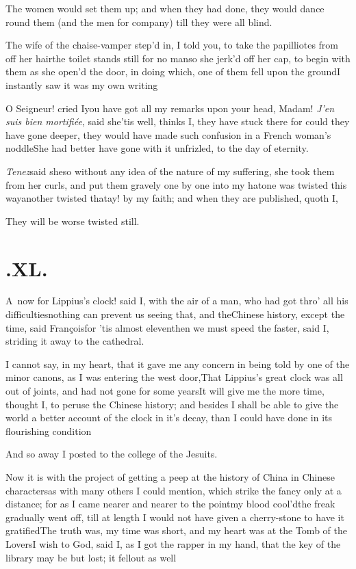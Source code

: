 \documentclass{article}
\begin{document}
The women would set them up; and when they had done, they would
dance round them (and the men for company) till they were all
blind.

The wife of the chaise-vamper step’d in, I told you, to
take the papilliotes from off her hair\tsh the toilet
stands still for no man\tsh so she jerk’d off her
cap, to begin with them as she open’d the door, in doing
which, one of them fell upon the ground\tsk I instantly saw it was my own
writing\tsh

O Seigneur! cried I\tsk you have got all my remarks upon your
head, Madam!\break
\tsh \textit{J’en suis bien
mortifiée}, said she\tsh ’tis well, thinks
I, they have stuck there\break
\tsk for could they have gone deeper,
they would have made such confusion in a French
woman’s noddle\tsk She had better have gone with it
unfrizled, to the day of eternity.

\textit{Tenez}\tsk said she\tsk so without any idea of the
nature of my suffering, she took them from her curls, and put them
gravely one by one into my hat\tsh one was twisted this
way\tsh another twisted that\tsh ay! by my faith;
and when they are published, quoth I,\tsh

They will be worse twisted still.

\vfill{}\eject
\section{.\enspace XL.}

\lettrine{A}{\,} now for Lippius’s
clock! said I, with the air of a man, who had got thro’ all
his difficulties\tsh nothing can prevent us seeing that,
and the\break Chinese history, \etc except the time,\break
said François\tsh for ’tis almost
eleven\tsk then we must speed the faster, said I, striding it
away to the cathedral.

I cannot say, in my heart, that it gave me any concern in being
told by one of the minor canons, as I was entering the west
door,\tsk That Lippius’s great clock was all out of
joints, and had not gone for some years\tsh It will give
me the more time, thought I, to peruse the Chinese history;
and besides I shall be able to give the world a better account of
the
clock in it’s decay, than I could have done in its flourishing
condition\tsh

\tsh And so away I posted to the college of the
Jesuits.

Now it is with the project of getting a peep at the history of
China in Chinese characters\tsk as with many others
I could mention, which strike the fancy only at a distance; for as
I came nearer and nearer to the point\tsk my blood
cool’d\tsk the freak gradually went off, till at length I
would not have given a cherry-stone to have it gratified\tsh The truth was, my time was
short, and my heart was at the Tomb of the Lovers\tsh I
wish to God, said I, as I got the rapper in my hand, that the key
of the library may be but lost; it fell\break out as
well\tsh{}
\end{document}
